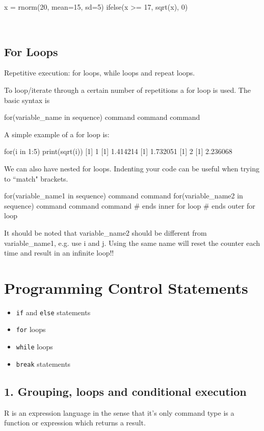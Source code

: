 x = rnorm(20, mean=15, sd=5)
ifelse(x >= 17, sqrt(x), 0)



 
\subsection{For Loops}

Repetitive execution: for loops, while loops and repeat loops.

To loop/iterate through a certain number of repetitions a for loop
is used. The basic syntax is

for(variable_name in sequence) {
command
command
command
}

A simple example of a for loop is:

for(i in 1:5){
print(sqrt(i))
}
[1] 1
[1] 1.414214
[1] 1.732051
[1] 2
[1] 2.236068


We can also have nested for loops. Indenting your code can be useful
when trying to “match" brackets.

for(variable_name1 in sequence) 
{
command
command
for(variable_name2 in sequence)
    {
    command
    command 
    command
    } # ends inner for loop
} # ends outer for loop

It should be noted that variable_name2 should be different from
variable_name1, e.g. use i and j. Using the same name will
reset the counter each time and result in an infinite loop!!







\section{Programming Control Statements}


\begin{itemize}
\item \texttt{if} and \texttt{else} statements
\item \texttt{for} loops
\item \texttt{while} loops
\item \texttt{break} statements
\end{itemize}
\subsection{1.	Grouping, loops and conditional execution}
R is an expression language in the sense that it’s only command type is a function or expression which returns a result. 

